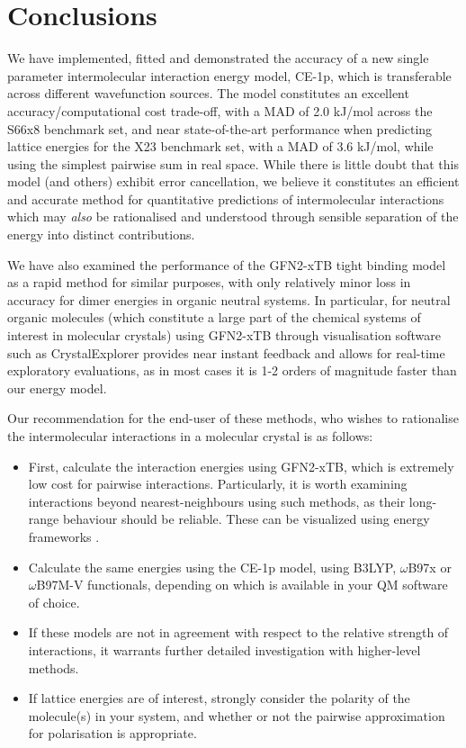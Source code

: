 \documentclass[preprint]{iucr}              %
\begin{document}
\section{Conclusions}

We have implemented, fitted and demonstrated the accuracy of a new single parameter 
intermolecular interaction energy model, CE-1p, which
is transferable across different wavefunction sources. The model constitutes an
excellent accuracy/computational cost trade-off, with a MAD of 2.0 kJ/mol across the S66x8
benchmark set, and near state-of-the-art performance when predicting lattice energies for the X23
benchmark set, with a MAD of 3.6 kJ/mol, while using the simplest pairwise sum in real space.
While there is little
doubt that this model (and others) exhibit error cancellation, we believe it constitutes an 
efficient and accurate method for quantitative predictions of intermolecular interactions which 
may \emph{also} be rationalised and understood through sensible separation of the energy into
distinct contributions.

We have also examined the performance of the GFN2-xTB tight binding model as a rapid method for 
similar purposes, with only relatively minor loss in accuracy for dimer energies in organic
neutral systems. In particular, for neutral organic molecules (which constitute a large part of
the chemical systems of interest in molecular crystals) using GFN2-xTB through visualisation 
software such as CrystalExplorer provides near instant feedback and allows for real-time 
exploratory evaluations, as in most cases it is 1-2 orders of magnitude faster than our energy
model.


Our recommendation for the end-user of these methods, who wishes to rationalise the
intermolecular interactions in a molecular crystal is as follows:
\begin{itemize}
    \item First, calculate the interaction energies using GFN2-xTB, which is extremely low cost for pairwise interactions. Particularly, it is worth examining interactions beyond nearest-neighbours using such methods, as their long-range behaviour should be reliable. These can be visualized using energy frameworks \cite{Turner2014}. 
    \item Calculate the same energies using the CE-1p model, using B3LYP, $\omega$B97x or $\omega$B97M-V functionals, depending on which is available in your QM software of choice.
    \item If these models are not in agreement with respect to the relative strength of interactions, it warrants further detailed investigation with higher-level methods.
    \item If lattice energies are of interest, strongly consider the polarity of the molecule(s) in your system, and whether or not the pairwise approximation for polarisation is appropriate.
\end{itemize}
\end{document}
